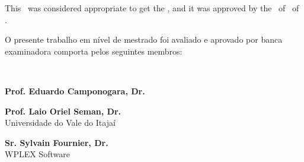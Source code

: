 


\begin{folhadeaprovacao}

    \begin{center}
        {\imprimirautor}

        \begin{center}
            \ABNTEXchapterfont\bfseries\MakeUppercase{\imprimirtitulo}\ifnotempty{\imprimirsubtitulo}{: \imprimirsubtitulo}
        \end{center}

        \begin{minipage}{\textwidth}
            \lang
            {
                This \imprimirtipotrabalho~was considered appropriate to get the \imprimirformacao,
                and it was approved by the \imprimirprograma~of \imprimircentro~of \imprimirinstituicao.
            }
            {
              \begin{center}
                O presente trabalho em nível de mestrado foi avaliado e
                aprovado por banca examinadora comporta pelos seguintes 
                membros: 
              \end{center}
            }
         \end{minipage}%
    \end{center}

    \begin{center}
   
      \textbf{\imprimirorientador}\\
      \imprimirinstituicao
      \vspace{1.5em}

      \textbf{Prof. Eduardo Camponogara, Dr. }\\
      \imprimirinstituicao 
      \vspace{1.5em}

      \textbf{Prof. Laio Oriel Seman, Dr.}\\
      Universidade do Vale do Itajaí
      \vspace{1.5em}

      \textbf{Sr. Sylvain Fournier, Dr.}\\
      WPLEX Software
      \vspace{1.5em}

    \end{center}


\end{folhadeaprovacao}
